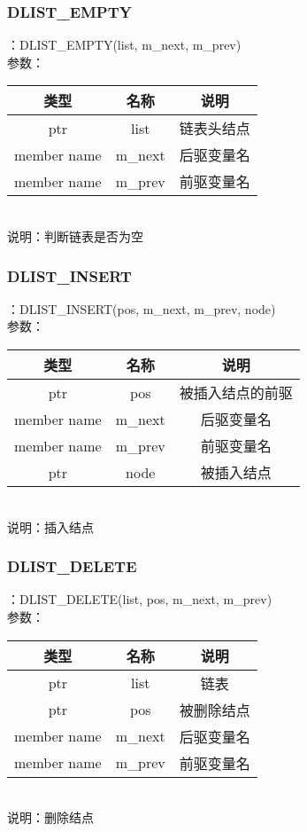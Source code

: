 \subsubsection{DLIST\_EMPTY}
：DLIST\_EMPTY(list, m\_next, m\_prev)\\
参数：\\
\begin{tabular}{|c|c|c|}
    \hline
    类型 & 名称 & 说明\\\hline
    ptr & list & 链表头结点\\\hline
    member name & m\_next & 后驱变量名\\\hline
    member name & m\_prev & 前驱变量名\\\hline
\end{tabular}\\
说明：判断链表是否为空

\subsubsection{DLIST\_INSERT}
：DLIST\_INSERT(pos, m\_next, m\_prev, node)\\
参数：\\
\begin{tabular}{|c|c|c|}
    \hline
    类型 & 名称 & 说明\\\hline
    ptr & pos & 被插入结点的前驱\\\hline
    member name & m\_next & 后驱变量名\\\hline
    member name & m\_prev & 前驱变量名\\\hline
    ptr & node & 被插入结点\\\hline
\end{tabular}\\
说明：插入结点


\subsubsection{DLIST\_DELETE}
：DLIST\_DELETE(list, pos, m\_next, m\_prev)\\
参数：\\
\begin{tabular}{|c|c|c|}
    \hline
    类型 & 名称 & 说明\\\hline
    ptr & list & 链表\\\hline
    ptr & pos & 被删除结点\\\hline
    member name & m\_next & 后驱变量名\\\hline
    member name & m\_prev & 前驱变量名\\\hline
\end{tabular}\\
说明：删除结点

